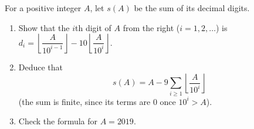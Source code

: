 For a positive integer $A$, let $s(A)$ be the sum of its decimal digits.
\begin{enumerate}
\item[(a)] Show that the $i$th digit of $A$ from the right ($i=1,2,\dots$) is $d_i=\left\lfloor\dfrac{A}{10^{i-1}}\right\rfloor-10\left\lfloor\dfrac{A}{10^{i}}\right\rfloor$.
\item[(b)] Deduce that
\[
s(A)=A-9\sum_{i\ge1}\left\lfloor\dfrac{A}{10^{i}}\right\rfloor
\]
(the sum is finite, since its terms are $0$ once $10^i>A$).
\item[(c)] Check the formula for $A=2019$.
\end{enumerate}
